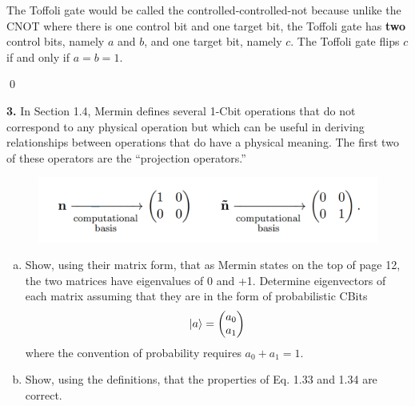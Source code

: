 \documentclass{book}
\theoremstyle{definition}
\begin{document}
\begin{enumerate}[(a)]
	The Toffoli gate would be called the controlled-controlled-not because unlike the CNOT where there is one control bit and one target bit, the Toffoli gate has \textbf{two} control bits, namely $a$ and $b$, and one target bit, namely $c$. The Toffoli gate flips $c$ if and only if $a = b = 1$. 
	
\end{enumerate}


\qed


\newpage
\noindent \textbf{3.} In Section 1.4, Mermin defines several 1-Cbit operations that do not correspond to any physical operation but which can be useful in deriving relationships between operations that do
have a physical meaning. The first two of these operators are the ``projection operators.'' 

\begin{figure}[!htb]
	\centering
	\includegraphics[scale=0.3]{proj}
\end{figure}
\begin{enumerate}[(a)]
	\item Show, using their matrix form, that as Mermin states on the top of page 12, the two
	matrices have eigenvalues of 0 and +1. Determine eigenvectors of each matrix assuming
	that they are in the form of probabilistic CBits
	\begin{align}
	\ket{a} = \begin{pmatrix}
	a_0 \\ a_1
	\end{pmatrix}
	\end{align}
	where the convention of probability requires $a_0 + a_1 = 1$. 
	
	\item Show, using the definitions, that the properties of Eq. 1.33 and 1.34 are correct.
	
\end{enumerate}
\end{document}
